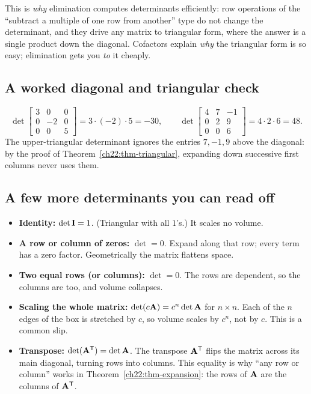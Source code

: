 This is \emph{why} elimination computes determinants efficiently: row operations of the
``subtract a multiple of one row from another'' type do not change the determinant, and they drive any
matrix to triangular form, where the answer is a single product down the diagonal. Cofactors explain
\emph{why} the triangular form is so easy; elimination gets you \emph{to} it cheaply.

\subsection{A worked diagonal and triangular check}

\[
\det\begin{bmatrix} 3 & 0 & 0 \\ 0 & -2 & 0 \\ 0 & 0 & 5 \end{bmatrix}=3\cdot(-2)\cdot5=-30,
\qquad
\det\begin{bmatrix} 4 & 7 & -1 \\ 0 & 2 & 9 \\ 0 & 0 & 6 \end{bmatrix}=4\cdot2\cdot6=48.
\]
The upper-triangular determinant ignores the entries $7,-1,9$ above the diagonal: by the proof of
Theorem~\ref{ch22:thm-triangular}, expanding down successive first columns never uses them.

\subsection{A few more determinants you can read off}

\begin{itemize}
\item \textbf{Identity:} $\det\mathbf{I} = 1$. (Triangular with all $1$'s.) It scales no volume.
\item \textbf{A row or column of zeros:} $\det = 0$. Expand along that row; every term has a zero
  factor. Geometrically the matrix flattens space.
\item \textbf{Two equal rows (or columns):} $\det=0$. The rows are dependent, so the columns are too,
  and volume collapses.
\item \textbf{Scaling the whole matrix:} $\det(c\mathbf{A})=c^n\det\mathbf{A}$ for $n\times n$. Each of the
  $n$ edges of the box is stretched by $c$, so volume scales by $c^n$, not by $c$. This is a
  common slip.
\item \textbf{Transpose:} $\det(\mathbf{A}^{\mathsf{T}})=\det\mathbf{A}$. The transpose $\mathbf{A}^{\mathsf{T}}$ flips the matrix across
  its main diagonal, turning rows into columns. This equality is why ``any row or column'' works
  in Theorem~\ref{ch22:thm-expansion}: the rows of $\mathbf{A}$ are the columns of $\mathbf{A}^{\mathsf{T}}$.
\end{itemize}

